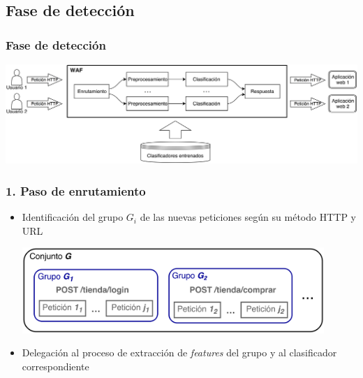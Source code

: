 \subsection{Fase de detección}

\begin{frame}
    \frametitle{Fase de detección}

    \begin{center}
        \hspace*{-0.75cm}
        \includegraphics[width=1.1\textwidth]{images/waf-diagram-detection.png}
    \end{center}
\end{frame}

\begin{frame}
    \frametitle{1. Paso de enrutamiento}

    \begin{itemize}[<2->]
        \item
        Identificación del grupo $G_{i}$ de las nuevas peticiones según
        su método HTTP y URL

        \begin{flushleft}
            \includegraphics[width=0.9\textwidth]{images/request-groups.png}
        \end{flushleft}

        \item
        Delegación al proceso de extracción de \textit{features} del
        grupo y al clasificador correspondiente
    \end{itemize}
\end{frame}

